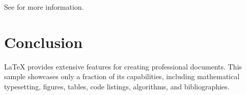 \documentclass{article}
\begin{document}
See \cite{latexcompanion} for more information.

\section{Conclusion}
\LaTeX{} provides extensive features for creating professional documents. This sample showcases only a fraction of its capabilities, including mathematical typesetting, figures, tables, code listings, algorithms, and bibliographies.
\end{document}
